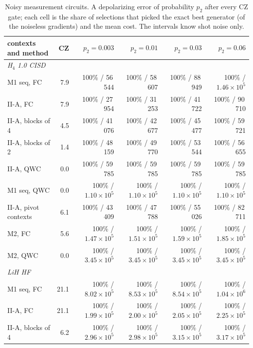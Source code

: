 \documentclass[aps,pra,reprint,superscriptaddress,nofootinbib]{revtex4-2}
\begin{document}
\begin{table}[!htb]
\centering\small
\caption{Noisy measurement circuits. A depolarizing error of probability $p_2$ after every CZ gate; each cell is the share of selections that picked the exact best generator (of the noiseless gradients) and the mean cost. The intervals know shot noise only.}
\label{tab:noise}
\begin{tabular}{lrrrrr}
\toprule
contexts and method & CZ & $p_2=0.003$ & $p_2=0.01$ & $p_2=0.03$ & $p_2=0.06$ \\
\midrule
\multicolumn{6}{l}{\emph{H$_4$ 1.0 CISD}} \\
M1 seq, FC & 7.9 & 100\% / 56\,544 & 100\% / 58\,607 & 100\% / 88\,949 & 100\% / $1.46\times10^{5}$ \\
II-A, FC & 7.9 & 100\% / 27\,954 & 100\% / 31\,253 & 100\% / 41\,722 & 100\% / 90\,710 \\
II-A, blocks of 4 & 4.5 & 100\% / 41\,076 & 100\% / 42\,677 & 100\% / 45\,477 & 100\% / 59\,721 \\
II-A, blocks of 2 & 1.4 & 100\% / 48\,159 & 100\% / 49\,770 & 100\% / 53\,544 & 100\% / 56\,655 \\
II-A, QWC & 0.0 & 100\% / 59\,785 & 100\% / 59\,785 & 100\% / 59\,785 & 100\% / 59\,785 \\
M1 seq, QWC & 0.0 & 100\% / $1.10\times10^{5}$ & 100\% / $1.10\times10^{5}$ & 100\% / $1.10\times10^{5}$ & 100\% / $1.10\times10^{5}$ \\
II-A, pivot contexts & 6.1 & 100\% / 43\,409 & 100\% / 47\,788 & 100\% / 55\,026 & 100\% / 82\,711 \\
M2, FC & 5.6 & 100\% / $1.47\times10^{5}$ & 100\% / $1.51\times10^{5}$ & 100\% / $1.59\times10^{5}$ & 100\% / $1.85\times10^{5}$ \\
M2, QWC & 0.0 & 100\% / $3.45\times10^{5}$ & 100\% / $3.45\times10^{5}$ & 100\% / $3.45\times10^{5}$ & 100\% / $3.45\times10^{5}$ \\
\multicolumn{6}{l}{\emph{LiH HF}} \\
M1 seq, FC & 21.1 & 100\% / $8.02\times10^{5}$ & 100\% / $8.53\times10^{5}$ & 100\% / $8.54\times10^{5}$ & 100\% / $1.04\times10^{6}$ \\
II-A, FC & 21.1 & 100\% / $1.99\times10^{5}$ & 100\% / $2.00\times10^{5}$ & 100\% / $2.05\times10^{5}$ & 100\% / $2.25\times10^{5}$ \\
II-A, blocks of 4 & 6.2 & 100\% / $2.96\times10^{5}$ & 100\% / $2.98\times10^{5}$ & 100\% / $3.15\times10^{5}$ & 100\% / $3.17\times10^{5}$ \\

\end{tabular}
\end{table}
\end{document}
